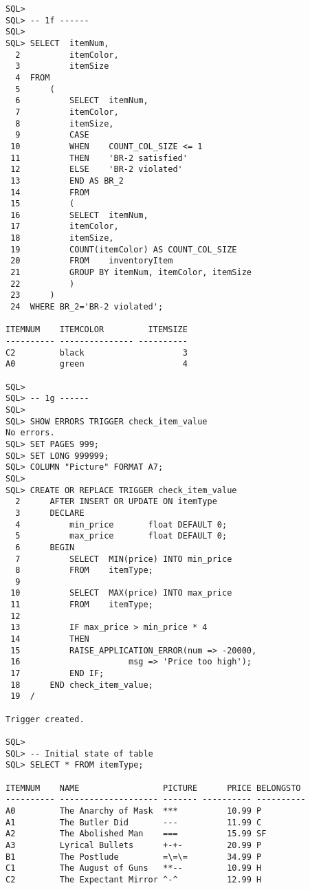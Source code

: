 \documentclass{article}
\begin{document}
\begin{lstlisting}
SQL> 
SQL> -- 1f ------
SQL> 
SQL> SELECT  itemNum,
  2  	     itemColor,
  3  	     itemSize
  4  FROM
  5  	 (
  6  	     SELECT  itemNum,
  7  	     itemColor,
  8  	     itemSize,
  9  	     CASE
 10  	     WHEN    COUNT_COL_SIZE <= 1
 11  	     THEN    'BR-2 satisfied'
 12  	     ELSE    'BR-2 violated'
 13  	     END AS BR_2
 14  	     FROM
 15  	     (
 16  		 SELECT  itemNum,
 17  		 itemColor,
 18  		 itemSize,
 19  		 COUNT(itemColor) AS COUNT_COL_SIZE
 20  		 FROM	 inventoryItem
 21  		 GROUP BY itemNum, itemColor, itemSize
 22  	     )
 23  	 )
 24  WHERE BR_2='BR-2 violated';

ITEMNUM    ITEMCOLOR         ITEMSIZE                                           
---------- --------------- ----------                                           
C2         black                    3                                           
A0         green                    4                                           

SQL> 
SQL> -- 1g ------
SQL> 
SQL> SHOW ERRORS TRIGGER check_item_value
No errors.
SQL> SET PAGES 999;
SQL> SET LONG 999999;
SQL> COLUMN "Picture" FORMAT A7;
SQL> 
SQL> CREATE OR REPLACE TRIGGER check_item_value
  2  	 AFTER INSERT OR UPDATE ON itemType
  3  	 DECLARE
  4  	     min_price	     float DEFAULT 0;
  5  	     max_price	     float DEFAULT 0;
  6  	 BEGIN
  7  	     SELECT  MIN(price) INTO min_price
  8  	     FROM    itemType;
  9  
 10  	     SELECT  MAX(price) INTO max_price
 11  	     FROM    itemType;
 12  
 13  	     IF max_price > min_price * 4
 14  	     THEN
 15  		 RAISE_APPLICATION_ERROR(num => -20000,
 16  					 msg => 'Price too high');
 17  	     END IF;
 18  	 END check_item_value;
 19  /

Trigger created.

SQL> 
SQL> -- Initial state of table
SQL> SELECT * FROM itemType;

ITEMNUM    NAME                 PICTURE      PRICE BELONGSTO                    
---------- -------------------- ------- ---------- ----------                   
A0         The Anarchy of Mask  ***          10.99 P                            
A1         The Butler Did       ---          11.99 C                            
A2         The Abolished Man    ===          15.99 SF                           
A3         Lyrical Bullets      +-+-         20.99 P                            
B1         The Postlude         =\=\=        34.99 P                            
C1         The August of Guns   **--         10.99 H                            
C2         The Expectant Mirror ^-^          12.99 H                            


\end{lstlisting}
\end{document}
